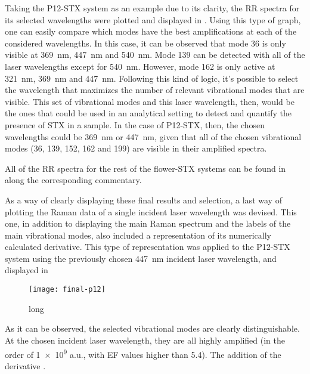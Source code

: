 Taking the P12-STX system as an example due to its clarity, the RR spectra for its selected wavelengths were plotted and displayed in .
Using this type of graph, one can easily compare which modes have the best amplifications at each of the considered wavelengths.
In this case, it can be observed that mode 36 is only visible at \SI{369}{\nano\metre}, \SI{447}{\nano\metre} and \SI{540}{\nano\metre}.
Mode 139 can be detected with all of the laser wavelengths except for \SI{540}{\nano\metre}.
However, mode 162 is only active at \SI{321}{\nano\metre}, \SI{369}{\nano\metre} and \SI{447}{\nano\metre}.
Following this kind of logic, it's possible to select the wavelength that maximizes the number of relevant vibrational modes that are visible.
This set of vibrational modes and this laser wavelength, then, would be the ones that could be used in an analytical setting to detect and quantify the presence of STX in a sample.
In the case of P12-STX, then, the chosen wavelengths could be \SI{369}{\nano\meter} or \SI{447}{\nano\meter}, given that all of the chosen vibrational modes (\num{36}, \num{139}, \num{152}, \num{162} and \num{199}) are visible in their amplified spectra.

All of the RR spectra for the rest of the flower-STX systems can be found in  along the corresponding commentary.

As a way of clearly displaying these final results and selection, a last way of plotting the Raman data of a single incident laser wavelength was devised.
This one, in addition to displaying the main Raman spectrum and the labels of the main vibrational modes, also included a representation of its numerically calculated derivative.
This type of representation was applied to the P12-STX system using the previously chosen \SI{447}{\nano\meter} incident laser wavelength, and displayed in 

\begin{figure*}[h]
    \texttt{[image: final-p12]}
    \caption[short]{long}
\end{figure*}

As it can be observed, the selected vibrational modes are clearly distinguishable.
At the chosen incident laser wavelength, they are all highly amplified (in the order of \num{1e9} a.u., with EF values higher than \num{5.4}).
The addition of the derivative .
